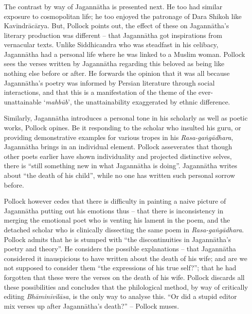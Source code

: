 \subsubsection{} The contrast by way of Jagannātha is presented next. He too had similar exposure to cosmopolitan life; he too enjoyed the patronage of Dara Shikoh like Kavīndrācārya. But, Pollock points out, the effect of these on Jagannātha’s literary production was different – that Jagannātha got inspirations from vernacular texts. Unlike Siddhicandra who was steadfast in his celibacy, Jagannātha had a personal life where he was linked to a Muslim woman. Pollock sees the verses written by Jagannātha regarding this beloved as being like nothing else before or after. He forwards the opinion that it was all because Jagannātha’s poetry was informed by Persian literature through social interactions, and that this is a manifestation of the theme of the ever-unattainable ‘{\sl mahbūb}’, the unattainability exaggerated by ethnic difference. 

Similarly, Jagannātha introduces a personal tone in his scholarly as well as poetic works, Pollock opines. Be it responding to the scholar who insulted his guru, or providing demonstrative examples for various tropes in his {\sl Rasa-gaṅgādhara}, Jagannātha brings in an individual element. Pollock asseverates that though other poets earlier have shown individuality and projected distinctive selves, there is “still something new in what Jagannātha is doing”. Jagannātha writes about “the death of his child”, while no one has written such personal sorrow before. 

Pollock however cedes that there is difficulty in painting a naive picture of Jagannātha putting out his emotions thus – that there is inconsistency in merging the emotional poet who is venting his lament in the poem, and the detached scholar who is clinically dissecting the same poem in {\sl Rasa-gaṅgādhara}. Pollock admits that he is stumped with “the discontinuities in Jagannātha’s poetry and theory”. He considers the possible explanations – that Jagannātha considered it inauspicious to have written about the death of his wife; and are we not supposed to consider them “the expressions of his true self?”; that he had forgotten that these were the verses on the death of his wife. Pollock discards all these possibilities and concludes that the philological method, by way of critically editing {\sl Bhāminīvilāsa}, is the only way to analyse this. “Or did a stupid editor mix verses up after Jagannātha’s death?” – Pollock muses.

